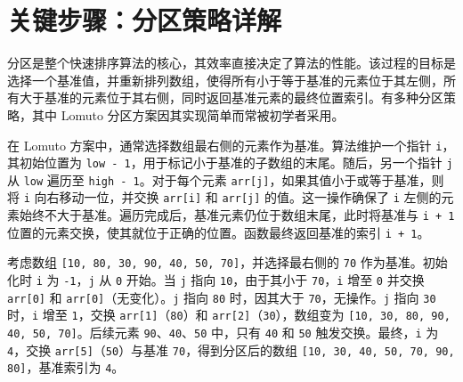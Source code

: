 \chapter{关键步骤：分区策略详解}
分区是整个快速排序算法的核心，其效率直接决定了算法的性能。该过程的目标是选择一个基准值，并重新排列数组，使得所有小于等于基准的元素位于其左侧，所有大于基准的元素位于其右侧，同时返回基准元素的最终位置索引。有多种分区策略，其中 Lomuto 分区方案因其实现简单而常被初学者采用。\par
在 Lomuto 方案中，通常选择数组最右侧的元素作为基准。算法维护一个指针 \texttt{i}，其初始位置为 \texttt{low - 1}，用于标记小于基准的子数组的末尾。随后，另一个指针 \texttt{j} 从 \texttt{low} 遍历至 \texttt{high - 1}。对于每个元素 \texttt{arr[j]}，如果其值小于或等于基准，则将 \texttt{i} 向右移动一位，并交换 \texttt{arr[i]} 和 \texttt{arr[j]} 的值。这一操作确保了 \texttt{i} 左侧的元素始终不大于基准。遍历完成后，基准元素仍位于数组末尾，此时将基准与 \texttt{i + 1} 位置的元素交换，使其就位于正确的位置。函数最终返回基准的索引 \texttt{i + 1}。\par
考虑数组 \texttt{[10, 80, 30, 90, 40, 50, 70]}，并选择最右侧的 \texttt{70} 作为基准。初始化时 \texttt{i} 为 \texttt{-1}，\texttt{j} 从 \texttt{0} 开始。当 \texttt{j} 指向 \texttt{10}，由于其小于 \texttt{70}，\texttt{i} 增至 \texttt{0} 并交换 \texttt{arr[0]} 和 \texttt{arr[0]}（无变化）。\texttt{j} 指向 \texttt{80} 时，因其大于 \texttt{70}，无操作。\texttt{j} 指向 \texttt{30} 时，\texttt{i} 增至 \texttt{1}，交换 \texttt{arr[1]}（\texttt{80}）和 \texttt{arr[2]}（\texttt{30}），数组变为 \texttt{[10, 30, 80, 90, 40, 50, 70]}。后续元素 \texttt{90}、\texttt{40}、\texttt{50} 中，只有 \texttt{40} 和 \texttt{50} 触发交换。最终，\texttt{i} 为 \texttt{4}，交换 \texttt{arr[5]}（\texttt{50}）与基准 \texttt{70}，得到分区后的数组 \texttt{[10, 30, 40, 50, 70, 90, 80]}，基准索引为 \texttt{4}。\par
